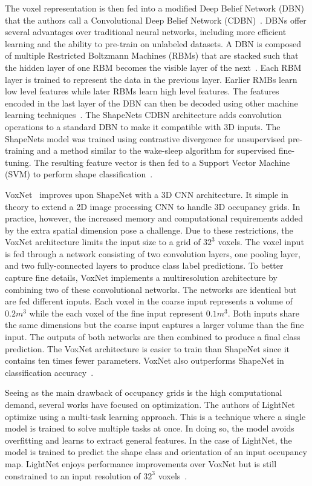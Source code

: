 The voxel representation is then fed into a modified Deep Belief Network (DBN) that the authors call a Convolutional Deep Belief Network (CDBN)~\cite{Wu2015}. DBNs offer several advantages over traditional neural networks, including more efficient learning and the ability to pre-train on unlabeled datasets. A DBN is composed of multiple Restricted Boltzmann Machines (RBMs) that are stacked such that the hidden layer of one RBM becomes the visible layer of the next~\cite{Aljabery2020}. Each RBM layer is trained to represent the data in the previous layer. Earlier RMBs learn low level features while later RBMs learn high level features. The features encoded in the last layer of the DBN can then be decoded using other machine learning techniques~\cite{McAfee2008}. The ShapeNets CDBN architecture adds convolution operations to a standard DBN to make it compatible with 3D inputs. The ShapeNets model was trained using contrastive divergence for unsupervised pre-training and a method similar to the wake-sleep algorithm for supervised fine-tuning. The resulting feature vector is then fed to a Support Vector Machine (SVM) to perform shape classification~\cite{Wu2015}.

VoxNet~\cite{Maturana2015} improves upon ShapeNet with a 3D CNN architecture. It simple in theory to extend a 2D image processing CNN to handle 3D occupancy grids. In practice, however, the increased memory and computational requirements added by the extra spatial dimension pose a challenge. Due to these restrictions, the VoxNet architecture limits the input size to a grid of $32^3$ voxels. The voxel input is fed through a network consisting of two convolution layers, one pooling layer, and two fully-connected layers to produce class label predictions. To better capture fine details, VoxNet implements a multiresolution architecture by combining two of these convolutional networks. The networks are identical but are fed different inputs. Each voxel in the coarse input represents a volume of $0.2m^3$ while the each voxel of the fine input represent $0.1m^3$. Both inputs share the same dimensions but the coarse input captures a larger volume than the fine input. The outputs of both networks are then combined to produce a final class prediction. The VoxNet architecture is easier to train than ShapeNet since it contains ten times fewer parameters. VoxNet also outperforms ShapeNet in classification accuracy~\cite{Maturana2015}.

Seeing as the main drawback of occupancy grids is the high computational demand, several works have focused on optimization. The authors of LightNet~\cite{Ye2016} optimize using a multi-task learning approach. This is a technique where a single model is trained to solve multiple tasks at once. In doing so, the model avoids overfitting and learns to extract general features. In the case of LightNet, the model is trained to predict the shape class and orientation of an input occupancy map. LightNet enjoys performance improvements over VoxNet but is still constrained to an input resolution of $32^3$ voxels~\cite{Ye2016}. 

